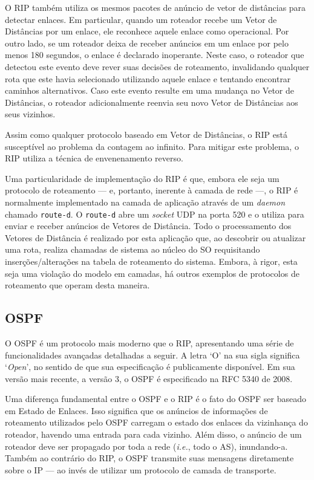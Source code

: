 \documentclass{article}
\begin{document}
O RIP também utiliza os mesmos pacotes de anúncio de vetor de distâncias para detectar enlaces. Em particular, quando um roteador recebe um Vetor de Distâncias por um enlace, ele reconhece aquele enlace como operacional. Por outro lado, se um roteador deixa de receber anúncios em um enlace por pelo menos 180 segundos, o enlace é declarado inoperante. Neste caso, o roteador que detectou este evento deve rever suas decisões de roteamento, invalidando qualquer rota que este havia selecionado utilizando aquele enlace e tentando encontrar caminhos alternativos. Caso este evento resulte em uma mudança no Vetor de Distâncias, o roteador adicionalmente reenvia seu novo Vetor de Distâncias aos seus vizinhos.

Assim como qualquer protocolo baseado em Vetor de Distâncias, o RIP está susceptível ao problema da contagem ao infinito. Para mitigar este problema, o RIP utiliza a técnica de envenenamento reverso.

Uma particularidade de implementação do RIP é que, embora ele seja um protocolo de roteamento --- e, portanto, inerente à camada de rede ---, o RIP é normalmente implementado na camada de aplicação através de um \textit{daemon} chamado \texttt{route-d}. O \texttt{route-d} abre um \textit{socket} UDP na porta 520 e o utiliza para enviar e receber anúncios de Vetores de Distância. Todo o processamento dos Vetores de Distância é realizado por esta aplicação que, ao descobrir ou atualizar uma rota, realiza chamadas de sistema ao núcleo do SO requisitando inserções/alterações na tabela de roteamento do sistema. Embora, à rigor, esta seja uma violação do modelo em camadas, há outros exemplos de protocolos de roteamento que operam desta maneira.

\subsection{OSPF}

O OSPF é um protocolo mais moderno que o RIP, apresentando uma série de funcionalidades avançadas detalhadas a seguir. A letra `O' na sua sigla significa `\textit{Open}', no sentido de que sua especificação é publicamente disponível. Em sua versão mais recente, a versão 3, o OSPF é especificado na RFC 5340 de 2008. 

Uma diferença fundamental entre o OSPF e o RIP é o fato do OSPF ser baseado em Estado de Enlaces. Isso significa que os anúncios de informações de roteamento utilizados pelo OSPF carregam o estado dos enlaces da vizinhança do roteador, havendo uma entrada para cada vizinho. Além disso, o anúncio de um roteador deve ser propagado por toda a rede (\textit{i.e.}, todo o AS), inundando-a. Também ao contrário do RIP, o OSPF transmite suas mensagens diretamente sobre o IP --- ao invés de utilizar um protocolo de camada de transporte.
\end{document}
